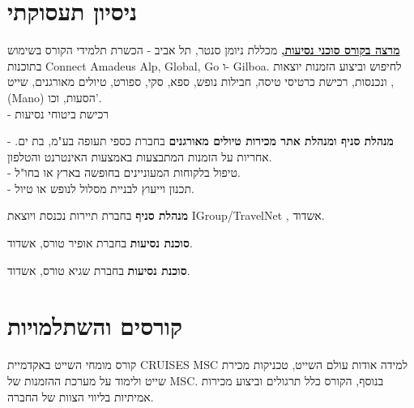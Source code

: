 \section{ניסיון תעסוקתי}

{\href{https://bit.ly/385JmIG}{
	\textbf{מרצה 
{בקורס סוכני נסיעות,}}}
מכללת ניומן סנטר, תל אביב}
{- הכשרת תלמידי הקורס בשימוש בתוכנות
Connect Amadeus Alp, Global, Go ו- Gilboa.
לחיפוש וביצוע הזמנות יוצאות ונכנסות, רכישת כרטיסי טיסה, חבילות נופש, ספא, סקי, ספורט, טיולים מאורגנים, שייט ,(Mano) הסעות, וכו'. \\
- רכישת ביטוחי נסיעות
}
{}

{\textbf{מנהלת סניף ומנהלת אתר מכירות טיולים מאורגנים }בחברת כספי תעופה בע"מ, בת ים.}
{
- אחריות על הזמנות המתבצעות באמצעות האינטרנט והטלפון.\\
- טיפול בלקוחות המעוניינים בחופשה בארץ או בחו"ל.\\
- תכנון וייעוץ לבניית מסלול לנופש או טיול.
}
{}

{\textbf{מנהלת סניף} בחברת תיירות נכנסת ויוצאת
	\setLTR IGroup/TravelNet \unsetLTR, אשדוד.}
{}
{}

{\textbf{סוכנת נסיעות} בחברת אופיר טורס, אשדוד.}
{}
{}

{\textbf{סוכנת נסיעות} בחברת שגיא טורס, אשדוד.}
{}
{}


	 

\section{קורסים והשתלמויות}

{קורס מומחי השייט באקדמיית CRUISES MSC}
{למידה אודות עולם השייט, טכניקות מכירת שייט ולימוד על מערכת ההזמנות של MSC.}
{בנוסף, הקורס כלל תרגולים וביצוע מכירות אמיתיות בליווי הצוות של החברה.}

